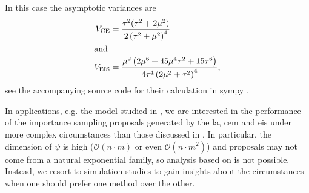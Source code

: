 \begin{example}
    In this case the asymptotic variances are
    \begin{align*}
        V_{{\text{CE}}} &= \frac{\tau^{2}(\tau^{2} + 2\mu^{2})}{2 \left( \tau^{2} + \mu^{2} \right)^{4}}\\
        \intertext{and}
        V_{{\text{EIS}}} &= \frac{\mu^{2} \left(2 \mu^{6} + 45 \mu^{4} \tau^{2} + 15 \tau^{6}\right)}{4 \tau^{4} \left(2 \mu^{2} + \tau^{2}\right)^{4}},
    \end{align*}
    see the accompanying source code for their calculation in sympy .
\end{example}


In applications, e.g. the model studied in , we are interested in the performance of the importance sampling proposals generated by the \gls{la}, \gls{cem} and \gls{eis} under more complex circumstances than those discussed in . In particular, the dimension of $\psi$ is high ($\mathcal O(n \cdot m)$ or even $\mathcal O(n \cdot m^{2})$) and proposals may not come from a natural exponential family, so analysis based on  is not possible. Instead, we resort to simulation studies to gain insights about the circumstances when one should prefer one method over the other. 


